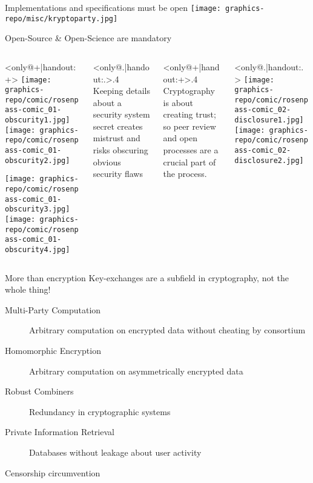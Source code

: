 \begin{frame}{Implementations and specifications must be open}
  \texttt{[image: graphics-repo/misc/kryptoparty.jpg]}
\end{frame}

\begin{frame}{Open-Source \& Open-Science are mandatory}
  \begin{columns}[onlytextwidth,c]
      \begin{column}<only@+|handout:+>{}
        \texttt{[image: graphics-repo/comic/rosenpass-comic\_01-obscurity1.jpg]}%
        \texttt{[image: graphics-repo/comic/rosenpass-comic\_01-obscurity2.jpg]}

        \texttt{[image: graphics-repo/comic/rosenpass-comic\_01-obscurity3.jpg]}%
        \texttt{[image: graphics-repo/comic/rosenpass-comic\_01-obscurity4.jpg]}
      \end{column}
		
      \begin{column}<only@.|handout:.>{.4\linewidth}
        Keeping details about a security system secret creates mistrust and risks obscuring obvious security flaws
      \end{column}

      \begin{column}<only@+|handout:+>{.4\linewidth}
        Cryptography is about creating trust; so peer review and open processes are a crucial part of the process.
      \end{column}
	\hfill
      \begin{column}<only@.|handout:.>{}
        \texttt{[image: graphics-repo/comic/rosenpass-comic\_02-disclosure1.jpg]}%
        \texttt{[image: graphics-repo/comic/rosenpass-comic\_02-disclosure2.jpg]}
      \end{column}
  \end{columns}
\end{frame}

\begin{frame}{More than encryption}
  \small
  Key-exchanges are a subfield in cryptography, not the whole thing!

  \begin{description}
    \item[Multi-Party Computation] Arbitrary computation on encrypted data without cheating by consortium
    \item[Homomorphic Encryption] Arbitrary computation on asymmetrically encrypted data
    \item[Robust Combiners] Redundancy in cryptographic systems
    \item[Private Information Retrieval] Databases without leakage about user activity
    \item[Censorship circumvention]
  \end{description}
\end{frame}

